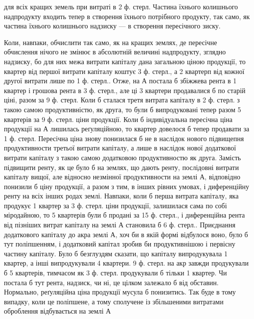 \parcont{}  %
для всіх кращих земель при витраті в 2  ф. стерл. Частина їхнього колишнього
надпродукту входить тепер в створення їхнього потрібного продукту, так
само, як частина їхнього колишнього надзиску — в створення пересічного зиску.

Коли, навпаки, обчислити так само, як на кращих землях, де пересічне обчислення
нічого не змінює в абсолютній величині надпродукту, зглядно надзиску, бо для
них межа витрати капіталу дана загальною ціною продукції, то квартер від першої
витрати капіталу коштує 3 ф. стерл., а 2 квартерп від кожної другої витрати
лише по 1  ф. стерл.. Отже, на А постала б збіжжева рента в 1 квартер
і грошова рента в 3 ф. стерл., але ці 3 квартери продавалися б по старій
ціні, разом за 9 ф. стерл. Коли б сталася третя витрата капіталу в 2  ф.
стерл. з такою самою продуктивністю, як друга, то були б випродуковані тепер
разом 5 квартерів за 9 ф. стерл. ціни продукції. Коли б індивідуальна
пересічна ціна продукції на А лишилась реґуляційною, то квартер довелося б
тепер продавати за 1  ф. стерл. Пересічна ціна знову понизилася б не в
наслідок нового підвищепня продуктивности третьої витрати капіталу, а лише в
наслідок нової додаткової витрати капіталу з такою самою додатковою продуктивностю
як друга. Замість підвищити ренту, як це було б на землях, що дають
ренту, послідовні витрати капіталу вищої, але відносно незмінної продуктивности
на землі А, відповідно понизили б ціну продукції, а разом з тим, в інших
рівних умовах, і диференційну ренту на всіх інших родах землі. Навпаки,
коли б перша витрата капіталу, яка продукує 1 квартер за 3 ф. стерл. ціни
продукції, залишилася сама по собі міродайною, то 5 квартерів були б продані
за 15 ф. стерл., і диференційна рента від пізніших витрат капіталу на землі
А становила б 6 ф. стерл.. Приєднання додаткового капіталу до акра землі А,
хоч би в якій формі відбулося воно, було б тут поліпшенням, і додатковий
капітал зробив би продуктивнішою і первісну частину капіталу. Було б безглуздям
сказати, що   капіталу випродукувала 1 квартер, а інші  випродукували
4 квартери. 9 ф. стерл. на акр завжди продукували б 5 квартерів, тимчасом
як 3 ф. стерл. продукували б тільки 1 квартер. Чи постала б тут рента, надзиск,
чи ні, це цілком залежало б від обставин. Нормально, реґуляційна ціна
продукції мусула б понизитись. Так буде в тому випадку, коли це поліпшене,
а тому сполучене із збільшеними витратами оброблення відбувається на землі А

